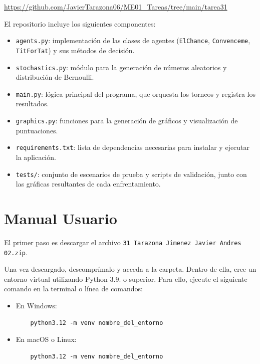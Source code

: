 \documentclass{article}
\begin{document}
\begin{center}
\url{https://github.com/JavierTarazona06/ME01_Tareas/tree/main/tarea31}
\end{center}

El repositorio incluye los siguientes componentes:

\begin{itemize}
  \item \texttt{agents.py}: implementación de las clases de agentes (\texttt{ElChance}, \texttt{Convenceme}, \texttt{TitForTat}) y sus métodos de decisión.
  \item \texttt{stochastics.py}: módulo para la generación de números aleatorios y distribución de Bernoulli.
  \item \texttt{main.py}: lógica principal del programa, que orquesta los torneos y registra los resultados.
  \item \texttt{graphics.py}: funciones para la generación de gráficos y visualización de puntuaciones.
  \item \texttt{requirements.txt}: lista de dependencias necesarias para instalar y ejecutar la aplicación.
  \item \texttt{tests/}: conjunto de escenarios de prueba y scripts de validación, junto con las gráficas resultantes de cada enfrentamiento.
\end{itemize}


\section{Manual Usuario}\label{sec:man_u}

El primer paso es descargar el archivo 
\texttt{31 Tarazona Jimenez Javier Andres 02.zip}.

Una vez descargado, descomprímalo y acceda a la carpeta. 
Dentro de ella, cree un 
entorno virtual utilizando Python 3.9. o superior. 
Para ello, ejecute el siguiente 
comando en 
la terminal o línea de comandos:

\begin{itemize}
  \item En Windows:
  \begin{verbatim}
    python3.12 -m venv nombre_del_entorno
  \end{verbatim}
  \item En macOS o Linux:
  \begin{verbatim}
    python3.12 -m venv nombre_del_entorno
  \end{verbatim}
\end{itemize}
\end{document}
